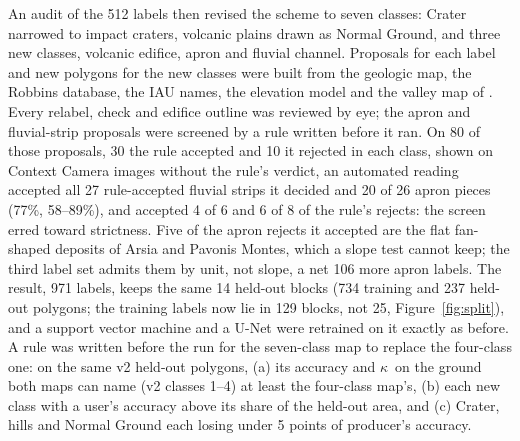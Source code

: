 \documentclass[twocolumn]{aastex701}
\newcommand{\kap}{$\kappa$}
\begin{document}
An audit of the 512 labels then revised the scheme to seven classes: Crater narrowed to impact craters, volcanic
plains drawn as Normal Ground, and three new classes, volcanic edifice, apron and fluvial channel. Proposals for each
label and new polygons for the new classes were built from the geologic map, the Robbins database, the IAU names, the
elevation model and the valley map of \citet{Alemanno2018}. Every relabel, check and edifice outline was reviewed by
eye; the apron and fluvial-strip proposals were screened by a rule written before it ran.
On 80 of those proposals, 30 the rule accepted and 10 it rejected in each class, shown on Context Camera images without the
rule's verdict, an automated reading accepted all 27 rule-accepted fluvial strips it decided and 20 of 26 apron pieces
(77\%, 58--89\%), and accepted 4 of 6 and 6 of 8 of the rule's rejects: the screen erred toward strictness. Five
of the apron rejects it accepted are the flat fan-shaped deposits of Arsia and Pavonis Montes, which a slope test
cannot keep; the third label set admits them by unit, not slope, a net 106 more apron labels. %
The result, 971 labels, keeps
the same 14 held-out blocks (734 training and 237 held-out polygons; the training labels now lie in 129 blocks, not 25,
Figure~\ref{fig:split}), and a support vector machine and a U-Net were
retrained on it exactly as before. A rule was written before the run for the seven-class map to replace the
four-class one: on the same v2 held-out polygons, (a) its accuracy and \kap\ on the ground both maps can name (v2
classes 1--4) at least the four-class map's, (b) each new class with a user's accuracy above its share of the
held-out area, and (c) Crater, hills and Normal Ground each losing under 5 points of producer's accuracy.
\end{document}
